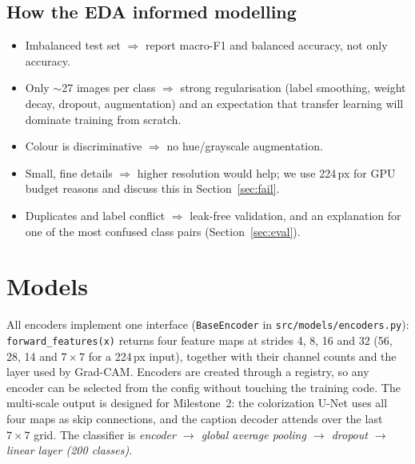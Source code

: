 \documentclass[11pt,a4paper]{article}
\begin{document}
\subsection{How the EDA informed modelling}
\begin{itemize}
\item Imbalanced test set $\Rightarrow$ report macro-F1 and balanced accuracy, not only accuracy.
\item Only $\sim$27 images per class $\Rightarrow$ strong regularisation (label smoothing, weight decay,
dropout, augmentation) and an expectation that transfer learning will dominate training from scratch.
\item Colour is discriminative $\Rightarrow$ no hue/grayscale augmentation.
\item Small, fine details $\Rightarrow$ higher resolution would help; we use 224\,px for GPU budget reasons and
discuss this in Section~\ref{sec:fail}.
\item Duplicates and label conflict $\Rightarrow$ leak-free validation, and an explanation for one of the most
confused class pairs (Section~\ref{sec:eval}).
\end{itemize}

\section{Models}
All encoders implement one interface (\texttt{BaseEncoder} in \texttt{src/models/encoders.py}):
\texttt{forward\_features(x)} returns four feature maps at strides 4, 8, 16 and 32 (56, 28, 14 and
$7\times7$ for a 224\,px input), together with their channel counts and the layer used by Grad-CAM. Encoders are
created through a registry, so any encoder can be selected from the config without touching the training
code. The multi-scale output is designed for Milestone~2: the colorization U-Net uses all four maps as skip
connections, and the caption decoder attends over the last $7\times7$ grid. The classifier is
\emph{encoder $\rightarrow$ global average pooling $\rightarrow$ dropout $\rightarrow$ linear layer (200 classes)}.
\end{document}
